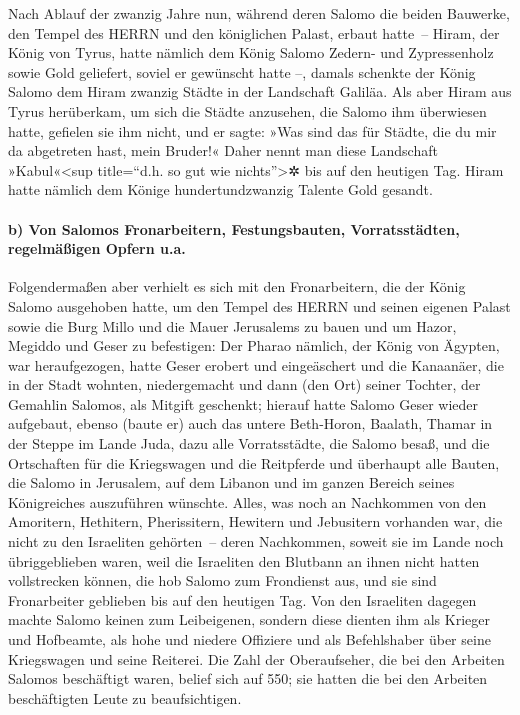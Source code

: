 Nach Ablauf der zwanzig Jahre nun, während deren Salomo
die beiden Bauwerke, den Tempel des HERRN und den königlichen Palast,
erbaut hatte~-- Hiram, der König von Tyrus, hatte nämlich
dem König Salomo Zedern- und Zypressenholz sowie Gold geliefert, soviel
er gewünscht hatte --, damals schenkte der König Salomo dem Hiram
zwanzig Städte in der Landschaft Galiläa. Als aber Hiram
aus Tyrus herüberkam, um sich die Städte anzusehen, die Salomo ihm
überwiesen hatte, gefielen sie ihm nicht, und er sagte:
»Was sind das für Städte, die du mir da abgetreten hast, mein Bruder!«
Daher nennt man diese Landschaft »Kabul«\textless sup title=``d.h. so
gut wie nichts''\textgreater✲ bis auf den heutigen Tag.
Hiram hatte nämlich dem Könige hundertundzwanzig Talente
Gold gesandt.

\hypertarget{b-von-salomos-fronarbeitern-festungsbauten-vorratsstuxe4dten-regelmuxe4uxdfigen-opfern-u.a.}{%
\paragraph{b) Von Salomos Fronarbeitern, Festungsbauten, Vorratsstädten,
regelmäßigen Opfern
u.a.}\label{b-von-salomos-fronarbeitern-festungsbauten-vorratsstuxe4dten-regelmuxe4uxdfigen-opfern-u.a.}}

Folgendermaßen aber verhielt es sich mit den
Fronarbeitern, die der König Salomo ausgehoben hatte, um den Tempel des
HERRN und seinen eigenen Palast sowie die Burg Millo und die Mauer
Jerusalems zu bauen und um Hazor, Megiddo und Geser zu befestigen:
Der Pharao nämlich, der König von Ägypten, war
heraufgezogen, hatte Geser erobert und eingeäschert und die Kanaanäer,
die in der Stadt wohnten, niedergemacht und dann (den Ort) seiner
Tochter, der Gemahlin Salomos, als Mitgift geschenkt;
hierauf hatte Salomo Geser wieder aufgebaut, ebenso
(baute er) auch das untere Beth-Horon, Baalath, Thamar in
der Steppe im Lande Juda, dazu alle Vorratsstädte, die
Salomo besaß, und die Ortschaften für die Kriegswagen und die Reitpferde
und überhaupt alle Bauten, die Salomo in Jerusalem, auf dem Libanon und
im ganzen Bereich seines Königreiches auszuführen wünschte.
Alles, was noch an Nachkommen von den Amoritern,
Hethitern, Pherissitern, Hewitern und Jebusitern vorhanden war, die
nicht zu den Israeliten gehörten~-- deren Nachkommen,
soweit sie im Lande noch übriggeblieben waren, weil die Israeliten den
Blutbann an ihnen nicht hatten vollstrecken können, die hob Salomo zum
Frondienst aus, und sie sind Fronarbeiter geblieben bis auf den heutigen
Tag. Von den Israeliten dagegen machte Salomo keinen zum
Leibeigenen, sondern diese dienten ihm als Krieger und Hofbeamte, als
hohe und niedere Offiziere und als Befehlshaber über seine Kriegswagen
und seine Reiterei. Die Zahl der Oberaufseher, die bei
den Arbeiten Salomos beschäftigt waren, belief sich auf 550; sie hatten
die bei den Arbeiten beschäftigten Leute zu beaufsichtigen.

